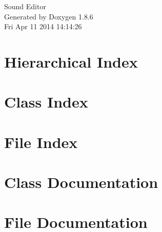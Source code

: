 \documentclass[twoside]{book}
\newcommand{\clearemptydoublepage}{%
  \newpage{\pagestyle{empty}\cleardoublepage}%
}
\begin{document}
\hypersetup{pageanchor=false}
\begin{titlepage}
\vspace*{7cm}
\begin{center}%
{\Large Sound Editor }\\
\vspace*{1cm}
{\large Generated by Doxygen 1.8.6}\\
\vspace*{0.5cm}
{\small Fri Apr 11 2014 14:14:26}\\
\end{center}
\end{titlepage}
\clearemptydoublepage
\tableofcontents
\clearemptydoublepage
{}
\hypersetup{pageanchor=true}

\chapter{Hierarchical Index}

\chapter{Class Index}

\chapter{File Index}

\chapter{Class Documentation}















\chapter{File Documentation}













\newpage
{}
{}
\printindex
\end{document}
